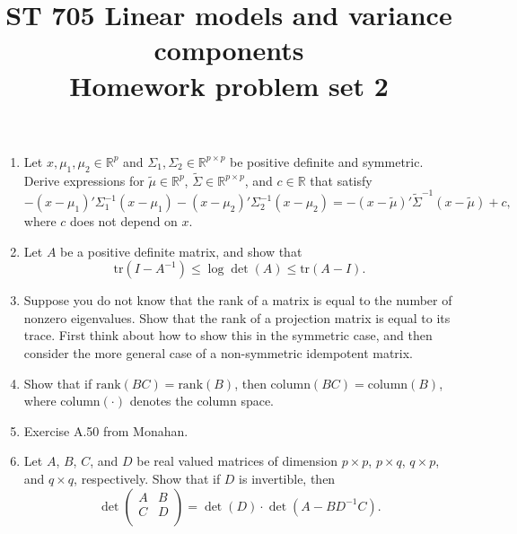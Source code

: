 \documentclass[11pt]{article}
\title{ST 705 Linear models and variance components \\ 
        Homework problem set 2}
\begin{document}
\maketitle

\begin{enumerate}

\item Let $x, \mu_{1}, \mu_{2} \in \mathbb{R}^{p}$ and $\Sigma_{1}, \Sigma_{2} \in \mathbb{R}^{p\times p}$ be positive definite and symmetric.  Derive expressions for $\widetilde{\mu} \in \mathbb{R}^{p}$, $\widetilde{\Sigma} \in \mathbb{R}^{p\times p}$, and $c \in \mathbb{R}$ that satisfy
\[
-(x - \mu_{1})'\Sigma_{1}^{-1}(x - \mu_{1}) - (x - \mu_{2})'\Sigma_{2}^{-1}(x - \mu_{2}) = -(x - \widetilde{\mu})'\widetilde{\Sigma}^{-1}(x - \widetilde{\mu}) + c,
\]
where $c$ does not depend on $x$.

\item Let $A$ be a positive definite matrix, and show that 
\[
\text{tr}(I - A^{-1}) \le \log\det(A) \le \text{tr}(A - I).
\]

\item Suppose you do not know that the rank of a matrix is equal to the number of nonzero eigenvalues.  Show that the rank of a projection matrix is equal to its trace.  First think about how to show this in the symmetric case, and then consider the more general case of a non-symmetric idempotent matrix.

\item Show that if $\text{rank}(BC) = \text{rank}(B)$, then $\text{column}(BC) = \text{column}(B)$, where column$(\cdot)$ denotes the column space.

\item Exercise A.50 from Monahan.

\item Let $A$, $B$, $C$, and $D$ be real valued matrices of dimension $p\times p$, $p\times q$, $q\times p$, and $q\times q$, respectively.  Show that if $D$ is invertible, then
\[
\det
\begin{pmatrix}
A & B \\
C & D \\
\end{pmatrix} = \det(D) \cdot \det(A - BD^{-1}C).
\]


\end{enumerate}
\end{document}
